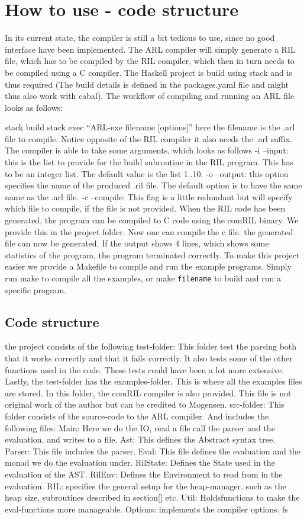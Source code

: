 \documentclass[a4paper]{article}
\begin{document}
\section{How to use - code structure}
\label{sec:orgc3bd244}
In its current state, the compiler is still a bit tedious to use, since no good interface have been implemented. The ARL compiler will simply generate a RIL file, which has to be compiled by the RIL compiler, which then in turn needs to be compiled using a C compiler. The Haskell project is build using stack and is thus required (The build details is defined in the packages.yaml file and might thus also work with cabal). The workflow of compiling and running an ARL file looks as follows:

stack build
stack exec ``ARL-exe filename [options]''
here the filename is the .arl file to compile. Notice opposite of the RIL compiler it also needs the .arl suffix. The compiler is able to take some arguments, which looks as follows
-i --input: this is the list to provide for the build subroutine in the RIL program. This has to be an integer list. The default value is the list 1..10.
-o --output: this option specifies the name of the produced .ril file. The default option is to have the same name as the .arl file.
-c --compile: This flag is a little redundant but will specify which file to compile, if the file is not provided.
When the RIL code has been generated, the program can be compiled to C code using the comRIL binary. We provide this in the project folder. Now one can compile the c file. the generated file can now be generated. If the output shows 4 lines, which shows some statistics of the program, the program terminated correctly. To make this project easier we provide a Makefile to compile and run the example programs. Simply run make to compile all the examples, or make \texttt{filename} to build and run a specific program.
\subsection{Code structure}
\label{sec:org8574572}
the project consists of the following
test-folder: This folder test the parsing both that it works correctly and that it fails correctly. It also tests some of the other functions used in the code. These tests could have been a lot more extensive. Lastly, the test-folder has the examples-folder. This is where all the examples files are stored. In this folder, the comRIL compiler is also provided. This file is not original work of the author but can be credited to Mogensen.
src-folder: This folder consists of the source-code to the ARL compiler. And includes the following files:
Main: Here we do the IO, read a file call the parser and the evaluation, and writes to a file.
Ast: This defines the Abstract syntax tree.
Parser: This file includes the parser.
Eval: This file defines the evaluation and the monad we do the evaluation under.
RilState: Defines the State used in the evaluation of the AST.
RilEnv:  Defines the Environment to read from in the evaluation.
RIL: specifies the general setup for the heap-manager. such as the heap size, subroutines described in section\ref{} etc.
Util: Holdsfunctions to make the eval-functions more manageable.
Options: implements the compiler options. fs
\end{document}
